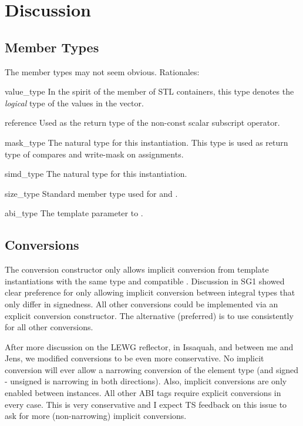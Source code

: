 \section{Discussion}

\subsection{Member Types}
The member types may not seem obvious.
Rationales:
\begin{typelist*}
  \item[value_type]
    In the spirit of the  member of STL containers, this type denotes the \emph{logical} type of the values in the vector.

  \item[reference]
    Used as the return type of the non-const scalar subscript operator.

  \item[mask_type]
    The natural \mask type for this \simd instantiation.
    This type is used as return type of compares and write-mask on assignments.

  \item[simd_type]
    The natural \simd type for this \mask instantiation.

  \item[size_type]
    Standard member type used for  and .

  \item[abi_type]
    The  template parameter to \simd.

\end{typelist*}

\subsection{Conversions}
The \simd conversion constructor only allows implicit conversion from \simd template instantiations with the same  type and compatible .
Discussion in SG1 showed clear preference for only allowing implicit conversion between integral types that only differ in signedness.
All other conversions could be implemented via an explicit conversion constructor.
The alternative (preferred) is to use \simdcast consistently for all other conversions.

After more discussion on the LEWG reflector, in Issaquah, and between me and Jens, we modified conversions to be even more conservative.
No implicit conversion will ever allow a narrowing conversion of the element type (and signed - unsigned is narrowing in both directions).
Also, implicit conversions are only enabled between \fixedsize instances.
All other ABI tags require explicit conversions in every case.
This is very conservative and I expect TS feedback on this issue to ask for more (non-narrowing) implicit conversions.

